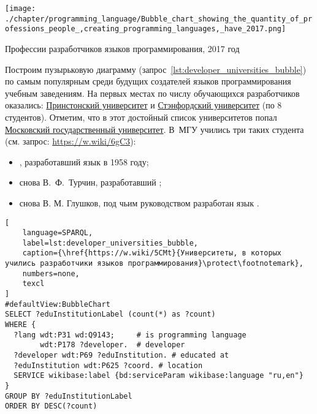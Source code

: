 \newpage
\begin{marginfigure}[0pt]
\texttt{[image: ./chapter/programming\_language/Bubble\_chart\_showing\_the\_quantity\_of\_professions\_people\_,creating\_programming\_languages,\_have\_2017.png]}
  \caption[Профессии разработчиков языков программирования, 2017 год.]
    {Профессии разработчиков языков программирования, 2017 год}
  \label{fig:2017_profession}
\end{marginfigure}
%
Построим пузырьковую диаграмму (запрос~\ref{lst:developer_universities_bubble}) 
по самым популярным среди будущих создателей языков программирования учебным заведениям. 
На первых местах по числу обучающихся разработчиков оказались: 
\href{https://www.wikidata.org/wiki/Q21578}{Принстонский университет} и 
\href{https://www.wikidata.org/wiki/Q41506}{Стэнфордский университет} (по 8 студентов). 
Отметим, что в этот достойный список университетов попал 
\href{https://www.wikidata.org/wiki/Q13164}{Московский государственный университет}. 
В~МГУ учились три таких студента 
(см. запрос: \href{https://w.wiki/6gC3}{https://w.wiki/6gC3}):
\begin{itemize}
    \item {}, разработавший язык  в 1958 году;

    \item снова В.~Ф.~Турчин, разработавший ;

    \item снова В. М. Глушков, под чьим руководством разработан 
        язык .
\end{itemize}



\begin{lstlisting}[
	language=SPARQL,
	label=lst:developer_universities_bubble,
    caption={\href{https://w.wiki/5CMt}{Университеты, в которых учились разработчики языков программирования}\protect\footnotemark},
    numbers=none,
	texcl
]
#defaultView:BubbleChart
SELECT ?eduInstitutionLabel (count(*) as ?count) 
WHERE {
  ?lang wdt:P31 wd:Q9143;     # is programming language
        wdt:P178 ?developer.  # developer
  ?developer wdt:P69 ?eduInstitution. # educated at
  ?eduInstitution wdt:P625 ?coord. # location
  SERVICE wikibase:label {bd:serviceParam wikibase:language "ru,en"}
}
GROUP BY ?eduInstitutionLabel
ORDER BY DESC(?count)
\end{lstlisting}



